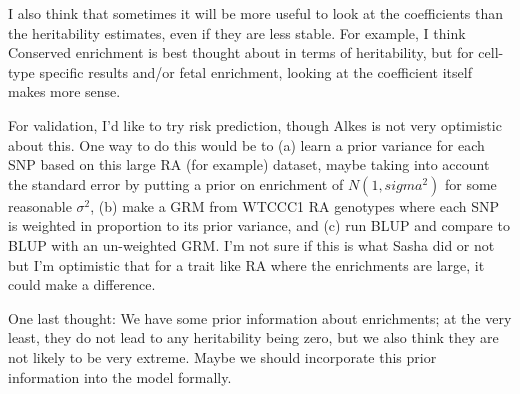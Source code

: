 \documentclass[11pt]{article}
\begin{document}
I also think that sometimes it will be more useful to look at the coefficients than the heritability estimates, even if they are less stable. For example, I think Conserved enrichment is best thought about in terms of heritability, but for cell-type specific results and/or fetal enrichment, looking at the coefficient itself makes more sense.

For validation, I'd like to try risk prediction, though Alkes is not very optimistic about this. One way to do this would be to (a) learn a prior variance for each SNP based on this large RA (for example) dataset, maybe taking into account the standard error by putting a prior on enrichment of $N(1,sigma^2)$ for some reasonable $\sigma^2$, (b) make a GRM from WTCCC1 RA genotypes where each SNP is weighted in proportion to its prior variance, and (c) run BLUP and compare to BLUP with an un-weighted GRM. I'm not sure if this is what Sasha did or not but I'm optimistic that for a trait like RA where the enrichments are large, it could make a difference.

One last thought: We have some prior information about enrichments; at the very least, they do not lead to any heritability being zero, but we also think they are not likely to be very extreme. Maybe we should incorporate this prior information into the model formally.
\end{document}
